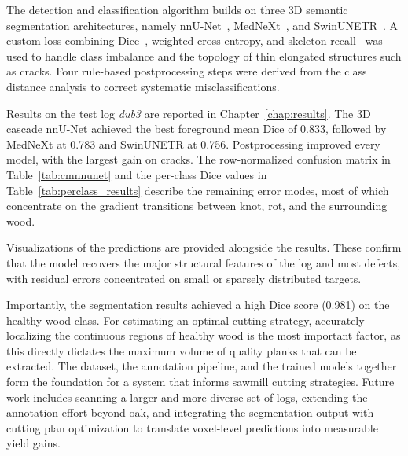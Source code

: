 The detection and classification algorithm builds on three 3D semantic segmentation architectures, namely nnU-Net~\cite{isensee2021nnunet}, MedNeXt~\cite{roy2023mednext}, and SwinUNETR~\cite{hatamizadeh2022swinunetr}. A custom loss combining Dice~\cite{milletari2016vnet}, weighted cross-entropy, and skeleton recall~\cite{kirchhoff2024skeletonrecall} was used to handle class imbalance and the topology of thin elongated structures such as cracks. Four rule-based postprocessing steps were derived from the class distance analysis to correct systematic misclassifications.

Results on the test log \textit{dub3} are reported in Chapter~\ref{chap:results}. The 3D cascade nnU-Net achieved the best foreground mean Dice of 0.833, followed by MedNeXt at 0.783 and SwinUNETR at 0.756. Postprocessing improved every model, with the largest gain on cracks. The row-normalized confusion matrix in Table~\ref{tab:cmnnunet} and the per-class Dice values in Table~\ref{tab:perclass_results} describe the remaining error modes, most of which concentrate on the gradient transitions between knot, rot, and the surrounding wood.

Visualizations of the predictions are provided alongside the results. These confirm that the model recovers the major structural features of the log and most defects, with residual errors concentrated on small or sparsely distributed targets.

Importantly, the segmentation results achieved a high Dice score (0.981) on the healthy wood class. For estimating an optimal cutting strategy, accurately localizing the continuous regions of healthy wood is the most important factor, as this directly dictates the maximum volume of quality planks that can be extracted. The dataset, the annotation pipeline, and the trained models together form the foundation for a system that informs sawmill cutting strategies. Future work includes scanning a larger and more diverse set of logs, extending the annotation effort beyond oak, and integrating the segmentation output with cutting plan optimization to translate voxel-level predictions into measurable yield gains.